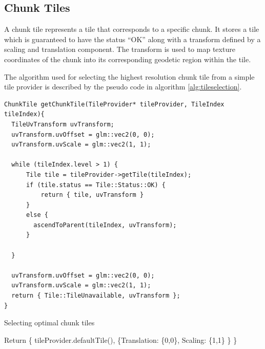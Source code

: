 \subsection{Chunk Tiles}
  
A chunk tile represents a tile that corresponds to a specific chunk. It stores a tile which is guaranteed to have the status ``OK'' along with a transform defined by a scaling and translation component. The transform is used to map texture coordinates of the chunk into its corresponding geodetic region within the tile. 

The algorithm used for selecting the highest resolution chunk tile from a simple tile provider is described by the pseudo code in algorithm \ref{alg:tileselection}.

\begin{verbatim}
ChunkTile getChunkTile(TileProvider* tileProvider, TileIndex tileIndex){
  TileUvTransform uvTransform;
  uvTransform.uvOffset = glm::vec2(0, 0);
  uvTransform.uvScale = glm::vec2(1, 1);

  while (tileIndex.level > 1) {
      Tile tile = tileProvider->getTile(tileIndex);
      if (tile.status == Tile::Status::OK) {
          return { tile, uvTransform }
      }
      else {
        ascendToParent(tileIndex, uvTransform);
      }
      
  }

  uvTransform.uvOffset = glm::vec2(0, 0);
  uvTransform.uvScale = glm::vec2(1, 1);
  return { Tile::TileUnavailable, uvTransform };
}
\end{verbatim}

\iffalse
\begin{algorithm}[htp]
 \caption{Selecting optimal chunk tiles}
  Return \{ tileProvider.defaultTile(), \{Translation: \{0,0\}, Scaling: \{1,1\} \} \}
  {}
  \label{alg:tileselection}
\end{algorithm}


